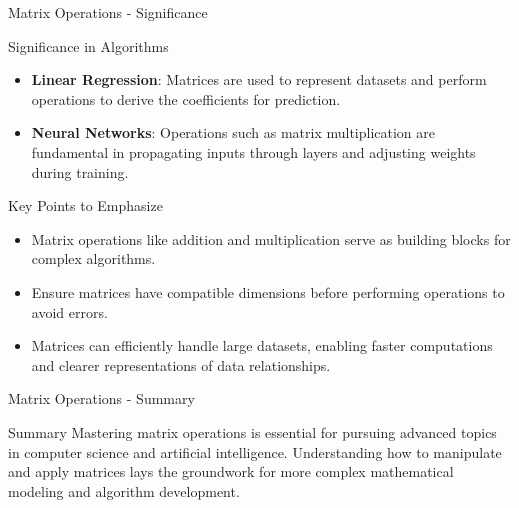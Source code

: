 \documentclass[aspectratio=169]{beamer}
\begin{document}
\begin{frame}[fragile]{Matrix Operations - Significance}
    \begin{block}{Significance in Algorithms}
        \begin{itemize}
            \item \textbf{Linear Regression}: Matrices are used to represent datasets and perform operations to derive the coefficients for prediction.
            \item \textbf{Neural Networks}: Operations such as matrix multiplication are fundamental in propagating inputs through layers and adjusting weights during training.
        \end{itemize}
    \end{block}
    
    \begin{block}{Key Points to Emphasize}
        \begin{itemize}
            \item Matrix operations like addition and multiplication serve as building blocks for complex algorithms.
            \item Ensure matrices have compatible dimensions before performing operations to avoid errors.
            \item Matrices can efficiently handle large datasets, enabling faster computations and clearer representations of data relationships.
        \end{itemize}
    \end{block}
\end{frame}

\begin{frame}[fragile]{Matrix Operations - Summary}
    \begin{block}{Summary}
        Mastering matrix operations is essential for pursuing advanced topics in computer science and artificial intelligence. 
        Understanding how to manipulate and apply matrices lays the groundwork for more complex mathematical modeling and algorithm development.
    \end{block}
\end{frame}
\end{document}
